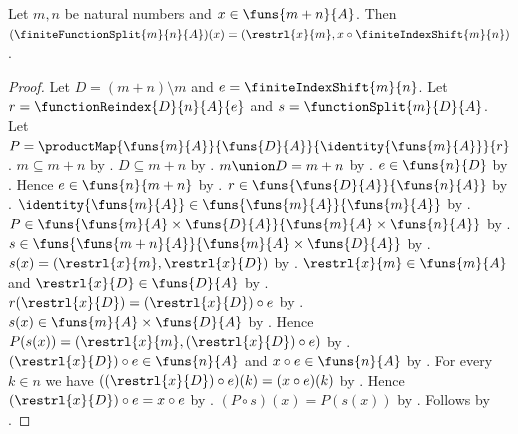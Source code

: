 \begin{theorem}\label{finite_function_split_apply}
    Let $m,n$ be natural numbers and $x\in\funs{m+n}{A}$.
    Then $(\finiteFunctionSplit{m}{n}{A})(x)
        =(\restrl{x}{m},x\circ\finiteIndexShift{m}{n})$.
\end{theorem}
\begin{proof}
    Let $D=(m+n)\setminus m$ and $e=\finiteIndexShift{m}{n}$.
    Let $r=\functionReindex{D}{n}{A}{e}$ and $s=\functionSplit{m}{D}{A}$.
    Let $P=\productMap{\funs{m}{A}}{\funs{D}{A}}{\identity{\funs{m}{A}}}{r}$.
    $m\subseteq m+n$ by .
    $D\subseteq m+n$ by .
    $m\union D=m+n$ by .
    $e\in\funs{n}{D}$ by .
    Hence $e\in\funs{n}{m+n}$ by .
    $r\in\funs{\funs{D}{A}}{\funs{n}{A}}$ by .
    $\identity{\funs{m}{A}}\in\funs{\funs{m}{A}}{\funs{m}{A}}$ by .
    $P\in\funs{\funs{m}{A}\times\funs{D}{A}}{\funs{m}{A}\times\funs{n}{A}}$ by
        .
    $s\in\funs{\funs{m+n}{A}}{\funs{m}{A}\times\funs{D}{A}}$ by
        .
    $s(x)=(\restrl{x}{m},\restrl{x}{D})$ by .
    $\restrl{x}{m}\in\funs{m}{A}$ and $\restrl{x}{D}\in\funs{D}{A}$ by .
    $r(\restrl{x}{D})=(\restrl{x}{D})\circ e$ by .
    $s(x)\in\funs{m}{A}\times\funs{D}{A}$ by .
    Hence $P(s(x))=(\restrl{x}{m},(\restrl{x}{D})\circ e)$ by
        .
    $(\restrl{x}{D})\circ e\in\funs{n}{A}$ and $x\circ e\in\funs{n}{A}$ by
        .
    For every $k\in n$ we have $((\restrl{x}{D})\circ e)(k)=(x\circ e)(k)$ by
        .
    Hence $(\restrl{x}{D})\circ e=x\circ e$ by
        .
    $(P\circ s)(x)=P(s(x))$ by .
    Follows by .
\end{proof}

